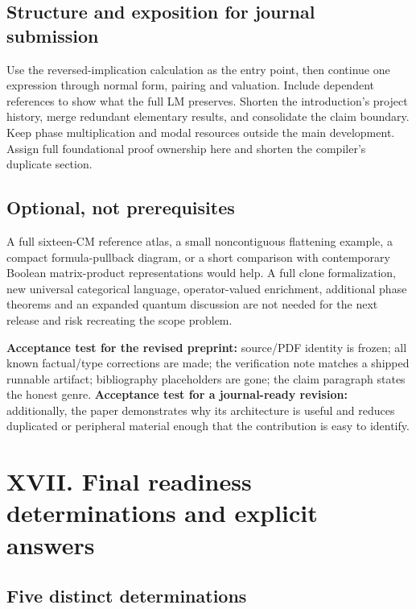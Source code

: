 \documentclass[
  10pt,
]{article}
\begin{document}
\subsection{Structure and exposition for journal
submission}\label{structure-and-exposition-for-journal-submission}

Use the reversed-implication calculation as the entry point, then
continue one expression through normal form, pairing and valuation.
Include dependent references to show what the full LM preserves. Shorten
the introduction's project history, merge redundant elementary results,
and consolidate the claim boundary. Keep phase multiplication and modal
resources outside the main development. Assign full foundational proof
ownership here and shorten the compiler's duplicate section.

\subsection{Optional, not
prerequisites}\label{optional-not-prerequisites}

A full sixteen-CM reference atlas, a small noncontiguous flattening
example, a compact formula-pullback diagram, or a short comparison with
contemporary Boolean matrix-product representations would help. A full
clone formalization, new universal categorical language, operator-valued
enrichment, additional phase theorems and an expanded quantum discussion
are not needed for the next release and risk recreating the scope
problem.

\textbf{Acceptance test for the revised preprint:} source/PDF identity
is frozen; all known factual/type corrections are made; the verification
note matches a shipped runnable artifact; bibliography placeholders are
gone; the claim paragraph states the honest genre. \textbf{Acceptance
test for a journal-ready revision:} additionally, the paper demonstrates
why its architecture is useful and reduces duplicated or peripheral
material enough that the contribution is easy to identify.

\section{XVII. Final readiness determinations and explicit
answers}\label{xvii.-final-readiness-determinations-and-explicit-answers}

\subsection{Five distinct
determinations}\label{five-distinct-determinations}
\end{document}
